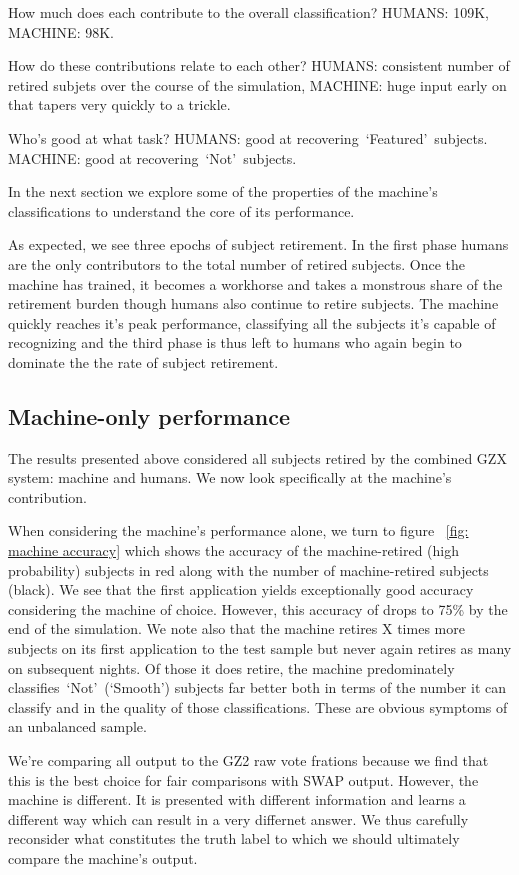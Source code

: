 \documentclass[twocolumn]{aastex6}
\newcommand{\feat}{`Featured'}
\newcommand{\notfeat}{`Not'}
\begin{document}
How much does each contribute to the overall classification? HUMANS: 109K,  MACHINE: 98K. 

How do these contributions relate to 
each other? HUMANS: consistent number of retired subjets over the course of the simulation,
MACHINE: huge input early on that tapers very quickly to a trickle. 

Who's good at what task? HUMANS: good at recovering~\feat~subjects. 
MACHINE: good at recovering~\notfeat~subjects. 

In the next section we explore some of the properties of the machine's classifications 
to understand the core of its performance.

As expected, we see three epochs of subject retirement. In the first phase humans
are the only contributors to the total number of retired subjects.  Once the machine
has trained, it becomes a workhorse and takes a monstrous share of the retirement
burden though humans also continue to retire subjects. The machine quickly reaches
it's peak performance, classifying all the subjects it's capable of recognizing and the
third phase is thus left to humans who again begin to dominate the the rate of 
subject retirement. 


\subsection{Machine-only performance}
The results presented above considered all subjects retired by the combined GZX system:
machine and humans. We now look specifically at the machine's contribution. 

When considering the machine's performance alone, we turn to figure
~\ref{fig: machine accuracy} which shows the accuracy of the machine-retired
 (high probability) subjects in red along with the number of machine-retired subjects (black). 
We see that the first application yields exceptionally good accuracy considering
the machine of choice. However, this accuracy of drops to 75\% by the end of the simulation.
We note also that the machine retires X times more subjects on its first 
application to the test sample but never again retires as many on subsequent nights. 
Of those it does retire, the machine predominately classifies~\notfeat~(`Smooth') subjects
far better both in terms of the number it can classify and in the quality of those classifications. 
These are obvious symptoms of an unbalanced sample. 


We're comparing all output to the GZ2 raw vote frations because we find that this is 
the best choice for fair comparisons with SWAP output. However, the machine is different.
It is presented with different information and learns a different way which can result in 
a very differnet answer. We thus carefully reconsider what constitutes the truth label to
which we should ultimately compare the machine's output. 
\end{document}
